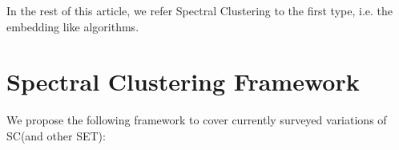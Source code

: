 In the rest of this article, we refer Spectral Clustering to the 
first type, i.e. the embedding like algorithms. 

%

\section{Spectral Clustering Framework}
\label{sec:framework}

We propose the following framework to cover currently 
surveyed variations of SC(and other SET):
